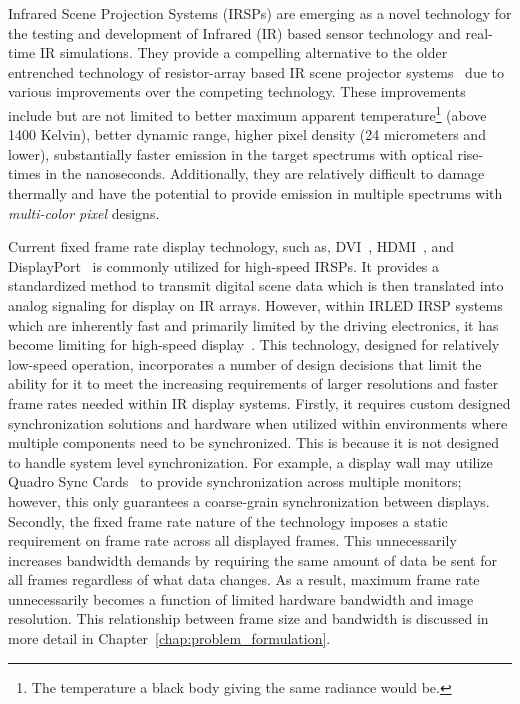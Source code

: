 \label{chap:introduction}

Infrared Scene Projection Systems (IRSPs) are emerging as a novel technology for the testing and development of Infrared (IR) based sensor technology and real-time IR simulations. They provide a compelling alternative to the older entrenched technology of resistor-array based IR scene projector systems~\cite{PritchardEtAl1998,WilliamsEtAl2005} due to various improvements over the competing technology. These improvements include but are not limited to better maximum apparent temperature\footnote{The temperature a black body giving the same radiance would be.} (above 1400 Kelvin), better dynamic range, higher pixel density (24 micrometers and lower), substantially faster emission in the target spectrums with optical rise-times in the nanoseconds. Additionally, they are relatively difficult to damage thermally and have the potential to provide emission in multiple spectrums with \emph{multi-color pixel} designs.

Current fixed frame rate display technology, such as, DVI~\cite{DDWG1999}, HDMI~\cite{HDMIForum2018}, and DisplayPort~\cite{BhowmikEtAl2012} is commonly utilized for high-speed IRSPs. It provides a standardized method to transmit digital scene data which is then translated into analog signaling for display on IR arrays. However, within IRLED IRSP systems which are inherently fast and primarily limited by the driving electronics, it has become limiting for high-speed display~\cite{LaVeignePrewarski2013}. This technology, designed for relatively low-speed operation, incorporates a number of design decisions that limit the ability for it to meet the increasing requirements of larger resolutions and faster frame rates needed within IR display systems. Firstly, it requires custom designed synchronization solutions and hardware when utilized within environments where multiple components need to be synchronized. This is because it is not designed to handle system level synchronization. For example, a display wall may utilize Quadro Sync Cards~\cite{NVIDIA2020_2} to provide synchronization across multiple monitors; however, this only guarantees a coarse-grain synchronization between displays. Secondly, the fixed frame rate nature of the technology imposes a static requirement on frame rate across all displayed frames. This unnecessarily increases bandwidth demands by requiring the same amount of data be sent for all frames regardless of what data changes. As a result, maximum frame rate unnecessarily becomes a function of limited hardware bandwidth and image resolution. This relationship between frame size and bandwidth is discussed in more detail in Chapter~\ref{chap:problem_formulation}.

